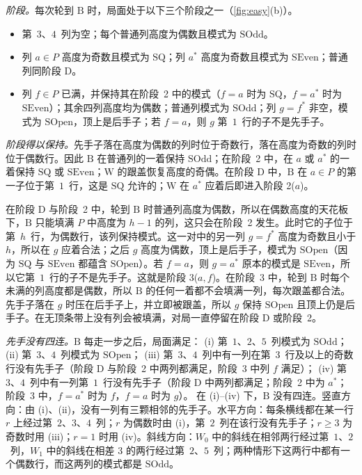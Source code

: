 \documentclass[11pt,a4paper]{article}
\makeatletter
\theoremstyle{zhthm}
\renewcommand{\proofname}{证明}
\renewenvironment{proof}[1][\proofname]{\par\pushQED{\qed}\normalfont
  \topsep6\p@\@plus6\p@\relax\trivlist\item[\hskip\labelsep\bfseries #1]\hspace{1em}\ignorespaces}
  {\popQED\endtrivlist\@endpefalse}
\newcommand{\B}{\mathrm{B}}
\newcommand{\W}{\mathrm{W}}
\makeatother
\begin{document}
\begin{proof}
\emph{阶段。}每次轮到 $\B$ 时，局面处于以下三个阶段之一（\cref{fig:easy}(b)）。
\begin{itemize}[leftmargin=4.2em,labelwidth=3.6em,labelsep=0.6em,align=left]
  \item[D：] 第~$3$、$4$~列为空；每个普通列高度为偶数且模式为 $\mathrm{SOdd}$。
  \item[2($a$)：] 列 $a\in P$ 高度为奇数且模式为 $\mathrm{SQ}$；列 $a^*$ 高度为奇数且模式为 $\mathrm{SEven}$；普通列同阶段 D。
  \item[3($a,f$)：] 列 $f\in P$ 已满，并保持其在阶段~2 中的模式（$f=a$ 时为 $\mathrm{SQ}$，$f=a^*$ 时为 $\mathrm{SEven}$）；其余四列高度均为偶数；普通列模式为 $\mathrm{SOdd}$；列 $g=f^*$ 非空，模式为 $\mathrm{SOpen}$，顶上是后手子；若 $f=a$，则 $g$ 第~$1$~行的子不是先手子。
\end{itemize}

\emph{阶段得以保持。}先手子落在高度为偶数的列时位于奇数行，落在高度为奇数的列时位于偶数行。因此 $\B$ 在普通列的一着保持 $\mathrm{SOdd}$；在阶段~2 中，在 $a$ 或 $a^*$ 的一着保持 $\mathrm{SQ}$ 或 $\mathrm{SEven}$；$\W$ 的跟盖恢复高度的奇偶。在阶段 D 中，$\B$ 在 $a\in P$ 的第一子位于第~$1$~行，这是 $\mathrm{SQ}$ 允许的；$\W$ 在 $a^*$ 应着后即进入阶段 2($a$)。

在阶段 D 与阶段~2 中，轮到 $\B$ 时普通列高度为偶数，所以在偶数高度的天花板下，$\B$ 只能填满 $P$ 中高度为 $h-1$ 的列，这只会在阶段~2 发生。此时它的子位于第~$h$~行，为偶数行，该列保持模式。这一对中的另一列 $g=f^*$ 高度为奇数且小于 $h$，所以在 $g$ 应着合法；之后 $g$ 高度为偶数，顶上是后手子，模式为 $\mathrm{SOpen}$（因为 $\mathrm{SQ}$ 与 $\mathrm{SEven}$ 都蕴含 $\mathrm{SOpen}$）。若 $f=a$，则 $g=a^*$ 原本的模式是 $\mathrm{SEven}$，所以它第~$1$~行的子不是先手子。这就是阶段 3($a,f$)。在阶段~3 中，轮到 $\B$ 时每个未满的列高度都是偶数，所以 $\B$ 的任何一着都不会填满一列，每次跟盖都合法。先手子落在 $g$ 时压在后手子上，并立即被跟盖，所以 $g$ 保持 $\mathrm{SOpen}$ 且顶上仍是后手子。在无顶条带上没有列会被填满，对局一直停留在阶段 D 或阶段~2。

\emph{先手没有四连。}$\B$ 每走一步之后，局面满足：
(i) 第~$1$、$2$、$5$~列模式为 $\mathrm{SOdd}$；
(ii) 第~$3$、$4$~列模式为 $\mathrm{SOpen}$；
(iii) 第~$3$、$4$~列中有一列在第~$3$~行及以上的奇数行没有先手子（阶段 D 与阶段~2 中两列都满足，阶段~3 中列 $f$ 满足）；
(iv) 第~$3$、$4$~列中有一列第~$1$~行没有先手子（阶段 D 中两列都满足；阶段~2 中为 $a^*$；阶段~3 中，$f=a^*$ 时为 $f$，$f=a$ 时为 $g$）。
在 (i)--(iv) 下，$\B$ 没有四连。竖直方向：由 (i)、(ii)，没有一列有三颗相邻的先手子。水平方向：每条横线都在某一行 $r$ 上经过第~$2$、$3$、$4$~列；$r$ 为偶数时由 (i)，第~$2$~列在该行没有先手子；$r\ge 3$ 为奇数时用 (iii)；$r=1$ 时用 (iv)。斜线方向：$W_0$ 中的斜线在相邻两行经过第~$1$、$2$~列，$W_1$ 中的斜线在相差 $3$ 的两行经过第~$2$、$5$~列；两种情形下这两行中都有一个偶数行，而这两列的模式都是 $\mathrm{SOdd}$。
\end{proof}
\end{document}
